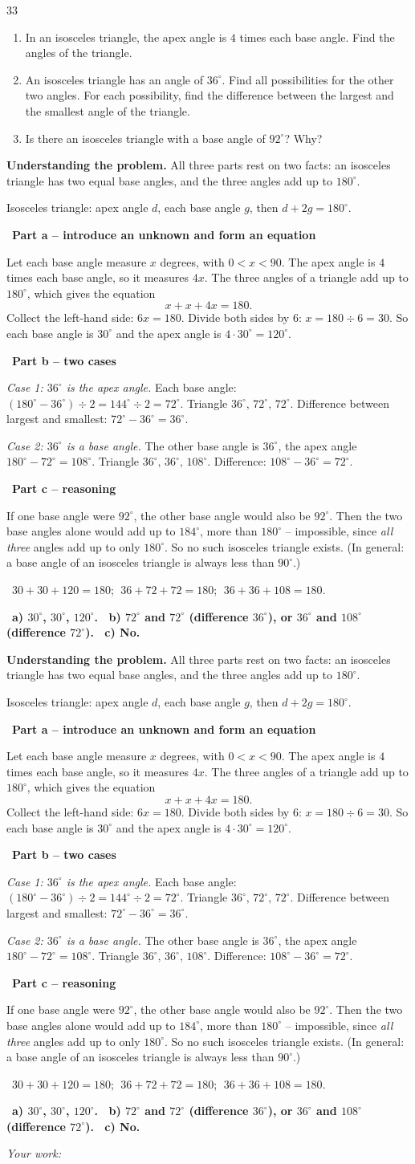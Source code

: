 \documentclass[11pt]{article}
\newif\ifsol \soltrue
\providecommand{\AnsWord}{Đáp số}
\newenvironment{probbox}[2]{\begin{probboxT}{#1}{#2}}{\end{probboxT}}
\newcommand{\StuProb}[2]{\begin{probboxS}{#1}{#2}\StuProbBody\end{probboxS}}
\newcommand{\ans}[1]{\par\smallskip{\bfseries\color{tmGreen!88!black}\AnsWord:}\ {\bfseries\color{AnsRed}#1}\par}
\newcommand{\probsol}[1]{%
  \begin{lrbox}{\solmeasure}\begin{minipage}{\dimexpr\linewidth-24pt\relax}#1\end{minipage}\end{lrbox}%
  \ifsol
    \begin{solbox}#1\end{solbox}%
  \else
    \setlength{\solht}{\dimexpr\ht\solmeasure+\dp\solmeasure+0.85cm\relax}%
    \ifdim\solht<1.35cm\setlength{\solht}{1.35cm}\fi
    \ifdim\solht>\StudentMaxWork\setlength{\solht}{\StudentMaxWork}\fi
    \par\noindent\begin{minipage}{\linewidth}%
    \expandafter\StuProb\StuProbArgs
    \begin{tcolorbox}[colback=white,colframe=Line,boxrule=0.8pt,arc=5pt,
      left=8pt,right=8pt,top=4pt,bottom=4pt,height=\solht]{\footnotesize\color{Slate}\itshape\WorkWord}\end{tcolorbox}%
    \end{minipage}\par\medskip
  \fi}
\newlength{\StudentMaxWork}\setlength{\StudentMaxWork}{4.5cm}
\newcommand{\step}[2]{\par\smallskip\noindent{\bfseries\color{tmBlue!85!black}\StepWord~#1.}\ {\bfseries #2}\par\nopagebreak}
\newcommand{\verify}[1]{\par\smallskip\noindent{\bfseries\color{tmGreen!80!black}\faCheckCircle\ \CheckWord}\ #1\par}
\def\WorkWord{Your work:}
\def\AnsWord{Answer}
\def\StepWord{Step}
\def\CheckWord{Check:}
\begin{document}
\begin{probbox}{33}{\relax}
\begin{enumerate}[label=\alph*),leftmargin=1.6em,itemsep=0pt,topsep=0pt]
  \item In an isosceles triangle, the apex angle is $4$ times each base angle. Find the angles of the triangle.
  \item An isosceles triangle has an angle of $36^\circ$. Find all possibilities for the other two angles. For each possibility, find the difference between the largest and the smallest angle of the triangle.
  \item Is there an isosceles triangle with a base angle of $92^\circ$? Why?
\end{enumerate}
\end{probbox}
\probsol{
\textbf{Understanding the problem.} All three parts rest on two facts: an isosceles triangle has two equal base angles, and the three angles add up to $180^\circ$.
\begin{recallbox}Isosceles triangle: apex angle $d$, each base angle $g$, then $d+2g=180^\circ$.\end{recallbox}
\step{1}{Part a -- introduce an unknown and form an equation}
Let each base angle measure $x$ degrees, with $0<x<90$. The apex angle is $4$ times each base angle, so it measures $4x$.
The three angles of a triangle add up to $180^\circ$, which gives the equation
\[ x+x+4x=180. \]
Collect the left-hand side: $6x=180$. Divide both sides by $6$: $x=180\div6=30$.
So each base angle is $30^\circ$ and the apex angle is $4\cdot30^\circ=120^\circ$.

\step{2}{Part b -- two cases}
\emph{Case 1: $36^\circ$ is the apex angle.} Each base angle: $(180^\circ-36^\circ)\div2=144^\circ\div2=72^\circ$. Triangle $36^\circ,\,72^\circ,\,72^\circ$. Difference between largest and smallest: $72^\circ-36^\circ=36^\circ$.

\emph{Case 2: $36^\circ$ is a base angle.} The other base angle is $36^\circ$, the apex angle $180^\circ-72^\circ=108^\circ$. Triangle $36^\circ,\,36^\circ,\,108^\circ$. Difference: $108^\circ-36^\circ=72^\circ$.

\step{3}{Part c -- reasoning}
\begin{proofbox}If one base angle were $92^\circ$, the other base angle would also be $92^\circ$. Then the two base angles alone would add up to $184^\circ$, more than $180^\circ$ -- impossible, since \emph{all three} angles add up to only $180^\circ$. So no such isosceles triangle exists. (In general: a base angle of an isosceles triangle is always less than $90^\circ$.)\end{proofbox}
\verify{$30+30+120=180$; $\;36+72+72=180$; $\;36+36+108=180$.}
\ans{a) $30^\circ$, $30^\circ$, $120^\circ$. \ b) $72^\circ$ and $72^\circ$ (difference $36^\circ$), or $36^\circ$ and $108^\circ$ (difference $72^\circ$). \ c) No.}
}
\end{document}
